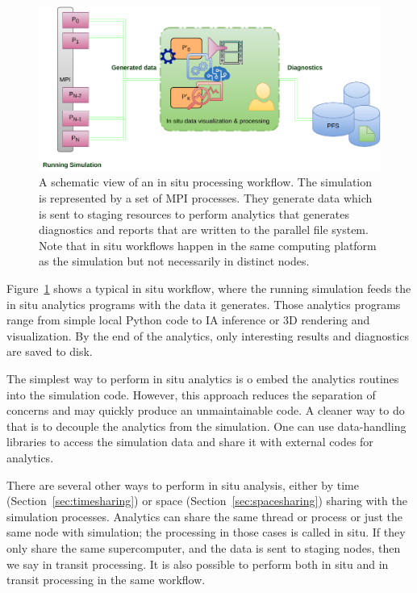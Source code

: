 \begin{figure}[tb]\centering
\includegraphics[scale=0.9]{figures/insitu.pdf}
\caption{A schematic view of an in situ processing workflow. The simulation is represented by a set of MPI processes. They generate data which is sent to staging resources to perform analytics that generates diagnostics and reports that are written to the parallel file system. Note that in situ workflows happen in the same computing platform as the simulation but not necessarily in distinct nodes.}
\label{figinsitu}
\end{figure}

Figure~\ref{figinsitu} shows a typical in situ workflow, where the running simulation feeds the in situ analytics programs with the data it generates. Those analytics programs range from simple local Python code to IA inference or 3D rendering and visualization. By the end of the analytics, only interesting results and diagnostics are saved to disk. 

The simplest way to perform in situ analytics is o embed the analytics routines into the simulation code. However, this approach reduces the separation of concerns and may quickly produce an unmaintainable code. A cleaner way to do that is to decouple the analytics from the simulation. One can use data-handling libraries to access the simulation data and share it with external codes for analytics.   
 
There are several other ways to perform in situ analysis, either by time (Section~\ref{sec:timesharing}) or space (Section~\ref{sec:spacesharing}) sharing with the simulation processes. 
Analytics can share the same thread or process or just the same node with simulation; the processing in those cases is called in situ. If they only share the same supercomputer, and the data is sent to staging nodes, then we say in transit processing. It is also possible to perform both in situ and in transit processing in the same workflow.

